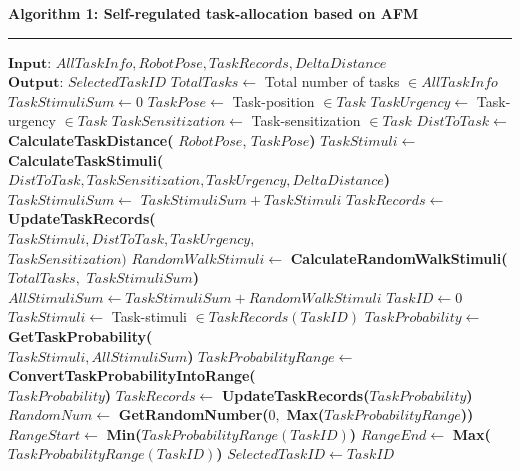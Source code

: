 \documentclass[final,5p,times,twocolumn]{elsarticle}
\newcommand{\HRule}{\rule{\linewidth}{0.3mm}}
\begin{document}
\textbf{Algorithm 1: Self-regulated task-allocation based on AFM}
\vspace{-3mm}
\newline
\HRule
\begin{algorithmic}[1]
\begin{small}
\label{alg:task-selector}
\State $\textbf{Input: } AllTaskInfo, RobotPose, TaskRecords, DeltaDistance$
\State $\textbf{Output: } SelectedTaskID$
\State {}
\State $TotalTasks \gets$  Total number of tasks $\in AllTaskInfo$  
\State $ TaskStimuliSum \gets 0 $
\State $ TaskPose \gets  $ Task-position  $ \in Task$
\State $ TaskUrgency \gets $ Task-urgency $ \in Task$
\State $ TaskSensitization \gets $ Task-sensitization $\in Task$
\State $ DistToTask \gets$
\textbf{CalculateTaskDistance(}
\newline
$RobotPose$, $TaskPose$\textbf{)}
\State $ TaskStimuli \gets  $ \textbf{CalculateTaskStimuli(}
\newline
$DistToTask, TaskSensitization, TaskUrgency, DeltaDistance$\textbf{)}
\State $ TaskStimuliSum \gets$  $TaskStimuliSum + TaskStimuli$
\State $ TaskRecords \gets $ \textbf{UpdateTaskRecords(\\}$TaskStimuli,DistToTask, TaskUrgency,$\\ $TaskSensitization\textbf{)}$
\EndFor
\State $RandomWalkStimuli \gets $ \textbf{CalculateRandomWalkStimuli(\\}$TotalTasks,$ %
 $TaskStimuliSum$\textbf{)}
\State $ AllStimuliSum \gets TaskStimuliSum + RandomWalkStimuli $
\State {}
\State $ TaskID \gets 0 $ 
\State $ TaskStimuli \gets $ Task-stimuli $\in TaskRecords(TaskID)$
\State $ TaskProbability \gets  $ \textbf{GetTaskProbability(\\}$TaskStimuli, AllStimuliSum$\textbf{)}
\State $ TaskProbabilityRange \gets $
\newline
 \textbf{ConvertTaskProbabilityIntoRange(}\\ $TaskProbability$\textbf{)}
\State $ TaskRecords \gets  $ \textbf{UpdateTaskRecords(}$TaskProbability$\textbf{)}
\EndWhile
\State {}
\State $ RandomNum \gets  $ 
\newline
\textbf{GetRandomNumber(}$0,$ \textbf{Max(}$TaskProbabilityRange$\textbf{))}
\State $ RangeStart \gets  $ \textbf{Min(}$TaskProbabilityRange (TaskID)$\textbf{)}
\State $ RangeEnd \gets  $ \textbf{Max(}$TaskProbabilityRange (TaskID)$\textbf{)}
\State $ SelectedTaskID \gets TaskID $ 
\EndIf
\EndWhile
\end{small}
\end{algorithmic}
\end{document}
